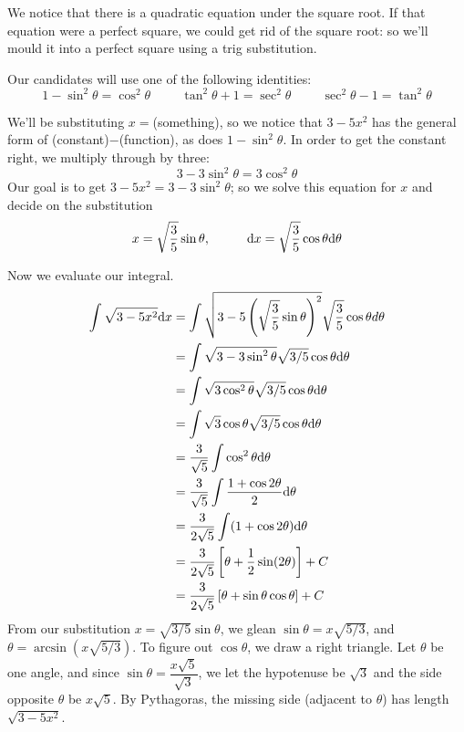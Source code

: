 \begin{solution}

We notice that there is a quadratic equation under the square root. If that equation were a perfect square, we could get rid of the square root: so we'll mould it into a perfect square using a trig substitution.

Our candidates will use one of the following identities:
\[1-\sin^2\theta=\cos^2\theta \hspace{1cm} \tan^2\theta+1=\sec^2\theta \hspace{1cm} \sec^2\theta-1=\tan^2\theta\]

We'll be substituting $x=$(something), so we notice that $3-5x^2$ has the general form of
(constant)$-$(function), as does $1-\sin^2\theta$. In order to get the constant right, we multiply through by three:
\[3-3\sin^2\theta = 3\cos^2\theta\]
Our goal is to get $3-5x^2=3-3\sin^2\theta$; so we solve this equation for $x$ and decide on the substitution
\[x=\sqrt{\frac{3}{5}}\sin\theta,\hspace{1cm}
\mathrm{d}x=\sqrt{\frac{3}{5}}\cos\theta \mathrm{d}\theta\]

Now we evaluate our integral.
\begin{align*}
\int\sqrt{3-5x^2}\mathrm{d}x&=\int\sqrt{3-5\left( \sqrt{\frac{3}{5}}\sin\theta\right)^2}\sqrt{\frac{3}{5}}\cos\theta d \theta\\
&=\int
\sqrt{3-3\sin^2\theta}\sqrt{3/5}\cos\theta
\mathrm{d}\theta\\
&=\int
\sqrt{3\cos^2\theta}\sqrt{3/5}\cos\theta
\mathrm{d}\theta\\
&=\int
\sqrt{3}\cos\theta\sqrt{3/5}\cos\theta
\mathrm{d}\theta\\
&=\frac{3}{\sqrt{5}}\int
\cos^2\theta
\mathrm{d}\theta\\
&=\frac{3}{\sqrt{5}}\int
\frac{1+\cos 2\theta}{2}
\mathrm{d}\theta\\
&=\frac{3}{2\sqrt{5}}\int
(1+\cos2\theta)
\mathrm{d}\theta\\
&=
\frac{3}{2\sqrt{5}}\left[
\theta+\frac{1}{2}\sin(2\theta)
\right]+C\\
&=\frac{3}{2\sqrt{5}}\left[
\theta + \sin\theta\cos\theta
\right]+C
\end{align*}
From our substitution $x=\sqrt{3/5}\sin\theta$, we glean $\sin\theta = x\sqrt{5/3}$, and $\theta = \arcsin \left(x\sqrt{5/3} \right)$. To figure out $\cos\theta$, we draw a right triangle. Let $\theta$ be one angle, and since $\sin\theta = \dfrac{x\sqrt{5}}{\sqrt{3}}$, we let the hypotenuse be $\sqrt{3}$ and the side opposite $\theta$ be $x\sqrt{5}$. By Pythagoras, the missing side (adjacent to $\theta$) has length $\sqrt{3-5x^2}$.


\end{solution}
